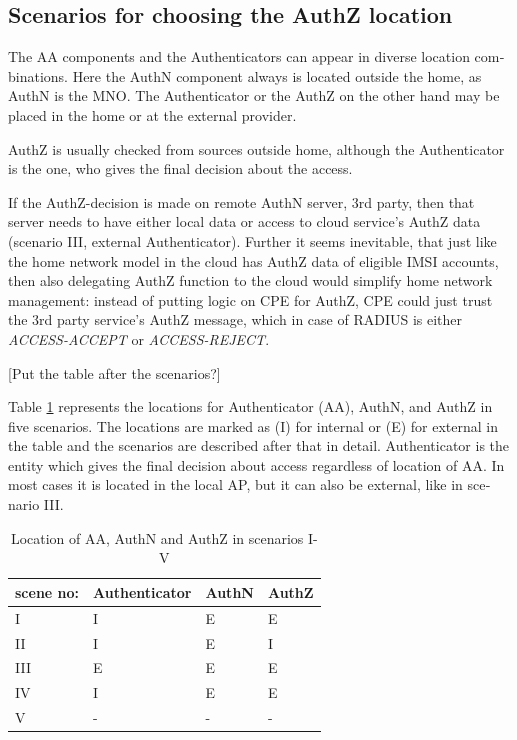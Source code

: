 \documentclass[12pt,a4paper,english]{tutthesis}
\begin{document}
\begin{otherlanguage}{english}
\section{Scenarios for choosing the AuthZ location}
\label{sec-4-6}


The AA components and the Authenticators can appear in 
diverse location combinations. Here the AuthN component 
always is located outside the home, as AuthN is the MNO.
The Authenticator or the AuthZ on the other hand
may be placed in the home or at the external provider.

AuthZ is usually checked from sources outside home, 
although the Authenticator is the one, who
gives the final decision about the access.

If the AuthZ-decision is made on remote AuthN server, 3rd party, 
then that server needs to have either local data or access to 
cloud service's AuthZ data (scenario III, external Authenticator).
Further it seems inevitable, that just like the home network model
in the cloud has  AuthZ data of eligible IMSI accounts,
then also delegating AuthZ function to the cloud would simplify home network 
management: instead of putting logic on CPE for AuthZ, CPE
could just trust the 3rd party service's AuthZ message, which in case
of RADIUS is either \emph{ACCESS-ACCEPT} or \emph{ACCESS-REJECT}.


[Put the table after the scenarios?]

Table \ref{table-scenarios} represents the locations for Authenticator (AA),
AuthN, and AuthZ in five scenarios. The locations are marked as (I)
for internal or (E) for external in the table and the scenarios are
described after that in detail. Authenticator is the entity which
gives the final decision about access regardless of location of AA.
In most cases it is located in the local AP, but it can also be
external, like in scenario III. 

\begin{table}[htb]
\caption{\label{table-scenarios}Location of AA, AuthN and AuthZ in scenarios I-V}
\centering
\begin{tabular}{llll}
scene no: & Authenticator & AuthN & AuthZ\\
\hline
I & I & E & E\\
II & I & E & I\\
III & E & E & E\\
IV & I & E & E\footnotemark\\
V & - & - & -\\
\end{tabular}
\end{table}



\end{otherlanguage}
\end{document}
